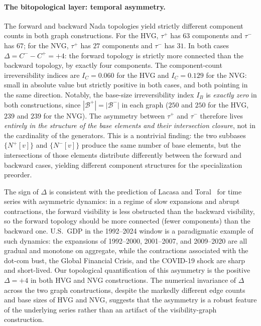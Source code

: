 \documentclass[11pt,a4paper]{article}
\theoremstyle{plain}
\theoremstyle{definition}
\newcommand{\Nfwd}[1]{N^{+}[#1]}
\newcommand{\Nbwd}[1]{N^{-}[#1]}
\newcommand{\taufwd}{\tau^{+}}
\newcommand{\taubwd}{\tau^{-}}
\newcommand{\base}{\mathcal{B}}
\begin{document}
\paragraph{The bitopological layer: temporal asymmetry.}
The forward and backward Nada topologies yield strictly different
component counts in both graph constructions. For the HVG, $\taufwd$ has
$63$ components and $\taubwd$ has $67$; for the NVG, $\taufwd$ has $27$
components and $\taubwd$ has $31$. In both cases $\Delta = C^{-} - C^{+}
= +4$: the forward topology is strictly more connected than the backward
topology, by exactly four components. The component-count irreversibility
indices are $I_C = 0.060$ for the HVG and $I_C = 0.129$ for the NVG:
small in absolute value but strictly positive in both cases, and both
pointing in the same direction. Notably, the base-size irreversibility
index $I_B$ is \emph{exactly zero} in both constructions, since
$|\base^{+}| = |\base^{-}|$ in each graph ($250$ and $250$ for the HVG,
$239$ and $239$ for the NVG). The asymmetry between $\taufwd$ and
$\taubwd$ therefore lives \emph{entirely in the structure of the base
elements and their intersection closure}, not in the cardinality of the
generators. This is a nontrivial finding: the two subbases $\{\Nfwd{v}\}$
and $\{\Nbwd{v}\}$ produce the same number of base elements, but the
intersections of those elements distribute differently between the
forward and backward cases, yielding different component structures for
the specialization preorder.

The sign of $\Delta$ is consistent with the prediction of Lacasa and
Toral~\cite{LacasaToral2010} for time series with asymmetric dynamics:
in a regime of slow expansions and abrupt contractions, the forward
visibility is less obstructed than the backward visibility, so the
forward topology should be more connected (fewer components) than the
backward one. U.S.\ GDP in the 1992--2024 window is a paradigmatic
example of such dynamics: the expansions of 1992--2000, 2001--2007, and
2009--2020 are all gradual and monotone on aggregate, while the
contractions associated with the dot-com bust, the Global Financial
Crisis, and the COVID-19 shock are sharp and short-lived. Our
topological quantification of this asymmetry is the positive
$\Delta = +4$ in both HVG and NVG constructions. The numerical
invariance of $\Delta$ across the two graph constructions, despite the
markedly different edge counts and base sizes of HVG and NVG, suggests
that the asymmetry is a robust feature of the underlying series rather
than an artifact of the visibility-graph construction.
\end{document}
